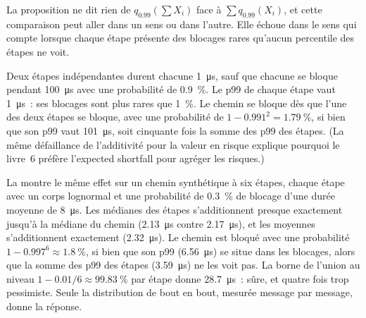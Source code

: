 La proposition ne dit rien de $q_{0.99}(\sum X_i)$ face à $\sum q_{0.99}(X_i)$, et cette comparaison peut aller
dans un sens ou dans l'autre. Elle échoue dans le sens qui compte lorsque chaque étape présente des blocages rares
qu'aucun percentile des étapes ne voit.

\begin{example}\label{ex:ll:where-latency-comes-from:nonsub}
Deux étapes indépendantes durent chacune \qty{1}{\micro\second}, sauf que chacune se bloque pendant \qty{100}{\micro\second} avec
une probabilité de 0.9~\%. Le p99 de chaque étape vaut \qty{1}{\micro\second}~: ses blocages sont plus rares que 1~\%. Le chemin se bloque dès que
l'une des deux étapes se bloque, avec une probabilité de $1-0.991^2 = 1.79~\%$, si bien que son p99 vaut \qty{101}{\micro\second}, soit cinquante fois la
somme des p99 des étapes. (La même défaillance de l'additivité pour la valeur en risque explique pourquoi le livre~6 préfère
l'expected shortfall pour agréger les risques.)
\end{example}

La  montre le même effet sur un chemin synthétique à six étapes, chaque étape avec un
corps lognormal et une probabilité de 0.3~\% de blocage d'une durée moyenne de \qty{8}{\micro\second}. Les médianes des étapes
s'additionnent presque exactement jusqu'à la médiane du chemin (\qty{2.13}{\micro\second} contre \qty{2.17}{\micro\second}), et les moyennes
s'additionnent exactement (\qty{2.32}{\micro\second}). Le chemin est bloqué avec une probabilité $1-0.997^6 \approx 1.8~\%$, si bien que son p99
(\qty{6.56}{\micro\second}) se situe dans les blocages, alors que la somme des p99 des étapes (\qty{3.59}{\micro\second}) ne
les voit pas. La borne de l'union au niveau $1-0.01/6 \approx 99.83~\%$ par étape donne \qty{28.7}{\micro\second}~: sûre,
et quatre fois trop pessimiste. Seule la distribution de bout en bout, mesurée message par message, donne la réponse.

